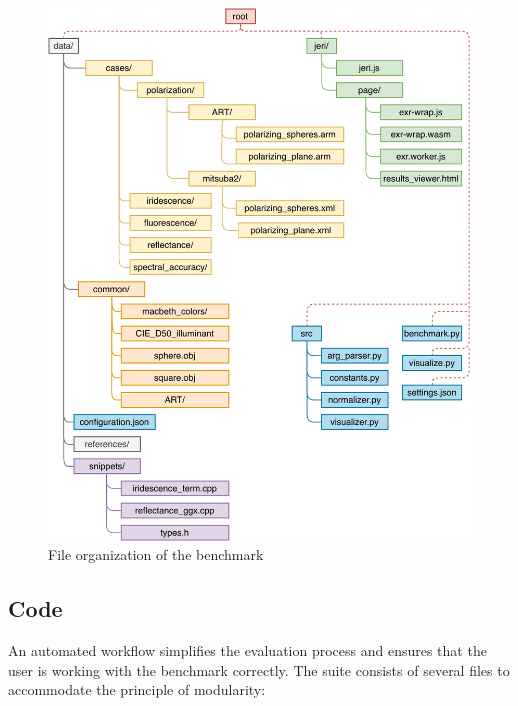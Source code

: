 \begin{figure}
	\centering
	\includegraphics[width=\linewidth]{img/framework.pdf}
	\caption{File organization of the benchmark}
	\label{fig:framework}
\end{figure}

\subsection{Code}

An automated workflow simplifies the evaluation process and ensures that the user is working with the benchmark correctly. The suite consists of several files to accommodate the principle of modularity:

